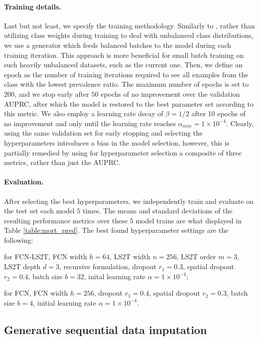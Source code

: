 \documentclass{article} \usepackage{iclr2021_conference,times}
\theoremstyle{plain}
\theoremstyle{definition}
\begin{document}
\paragraph{Training details.} Last but not least, we specify the training methodology. Similarly to \citet{horn2020set}, rather than utilizing class weights during training to deal with unbalanced class distributions, we use a generator which feeds balanced batches to the model during each training iteration. This approach is more beneficial for small batch training on such heavily unbalanced datasets, such as the current one. Then, we define an epoch as the number of training iterations required to see all examples from the class with the lowest prevalence ratio. The maximum number of epochs is set to $200$, and we stop early after $50$ epochs of no improvement over the validation {\sc AUPRC}, after which the model is restored to the best parameter set according to this metric. We also employ a learning rate decay of $\beta = 1/2$ after 10 epochs of no improvement and only until the learning rate reaches $\alpha_{min} = 1 \times 10^{-4}$. Clearly, using the same validation set for early stopping and selecting the hyperparameters introduces a bias in the model selection, however, this is partially remedied by using for hyperparameter selection a composite of three metrics, rather than just the {\sc AUPRC}.

\paragraph{Evaluation.} After selecting the best hyperparameters, we independently train and evaluate on the test set each model $5$ times. The means and standard deviations of the resulting performance metrics over these $5$ model trains are what displayed in Table \ref{table:mort_pred}. The best found hyperparameter settings are the following: \begin{enumerate*}[label=(\arabic*)] \item for FCN-LS2T, FCN width $h = 64$, LS2T width $n=256$, LS2T order $m=3$, LS2T depth $d=3$, recursive formulation, dropout $r_1 = 0.3$, spatial dropout $r_2 = 0.4$, batch size $b=32$, inital learning rate $\alpha = 1 \times 10^{-4}$; \item for FCN, FCN width $h=256$, dropout $r_1 = 0.4$, spatial dropout $r_2 = 0.3$, batch size $b=4$, initial learning rate $\alpha = 1 \times 10^{-4}$. \end{enumerate*}

 
\subsection{Generative sequential data imputation} \label{app:imputation}
\end{document}
